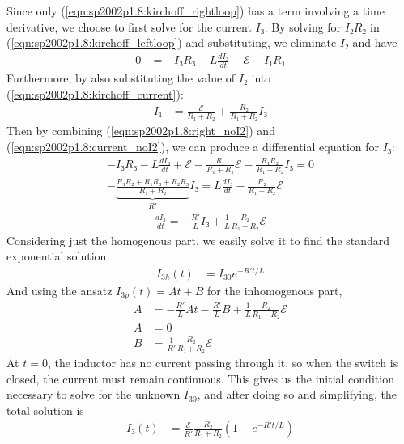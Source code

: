 Since only (\ref{eqn:sp2002p1.8:kirchoff_rightloop}) has a term involving
a time derivative, we choose to first solve for the current $I₃$. By solving
for $I₂R₂$ in (\ref{eqn:sp2002p1.8:kirchoff_leftloop}) and substituting,
we eliminate $I₂$ and have
\begin{align}
    0 &= -I₃R₃ - L\frac{dI₃}{dt} + \mathcal E - I₁R₁
    \label{eqn:sp2002p1.8:right_noI2}
\end{align}
Furthermore, by also substituting the value of $I₂$ into
(\ref{eqn:sp2002p1.8:kirchoff_current}):
\begin{align}
    I₁ &= \frac{\mathcal E}{R₁+R₂} + \frac{R₂}{R₁+R₂} I₃
    \label{eqn:sp2002p1.8:current_noI2}
\end{align}
Then by combining (\ref{eqn:sp2002p1.8:right_noI2}) and
(\ref{eqn:sp2002p1.8:current_noI2}), we can produce a differential equation
for $I₃$:
\begin{align*}
    -I₃R₃ - L\frac{dI₃}{dt} + \mathcal E - \frac{R₁}{R₁+R₂}\mathcal E -
	\frac{R₁R₂}{R₁+R₂}I₃ = 0
    \\
    -\underbrace{\frac{R₁R₂ + R₁R₃ + R₂R₃}{R₁+R₂}}_{R'}I₃ = L\frac{dI₃}{dt}
	- \frac{R₂}{R₁+R₂} \mathcal E
\end{align*}
\begin{align}
    \frac{dI₃}{dt} = -\frac{R'}{L} I₃ + \frac{1}{L}\frac{R₂}{R₁+R₂}\mathcal E
	\label{eqn:sp2002p1.8:diffeq_I3}
\end{align}
Considering just the homogenous part, we easily solve it to find the standard
exponential solution
\begin{align*}
    I_{3h}(t) &= I_{30} e^{-R't/L}
\end{align*}
And using the ansatz $I_{3p}(t) = At + B$ for the inhomogenous part,
\begin{align*}
    A &= -\frac{R'}{L}At - \frac{R'}{L}B + \frac 1L\frac{R₂}{R₁+R₂}\mathcal E
    \\
    A &= 0 \\
    B &= \frac{1}{R'}\frac{R₂}{R₁+R₂}\mathcal E
\end{align*}
At $t = 0$, the inductor has no current passing through it, so when the switch
is closed, the current must remain continuous. This gives us the initial
condition necessary to solve for the unknown $I_{30}$, and after doing so
and simplifying, the total solution is
\begin{align}
    I₃(t) &= \frac{\mathcal E}{R'}\frac{R₂}{R₁+R₂}(1 - e^{-R't/L})
	\label{eqn:sp2002p1.8:I3_charging}
\end{align}

